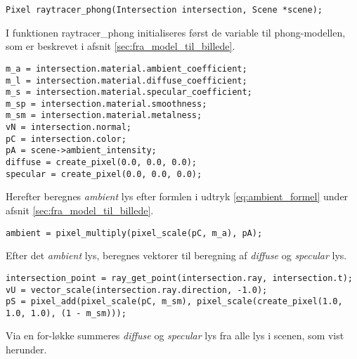 \begin{lstlisting}[style=Cstyle, caption=prototypen til funktionen der beregner pixelfarven på baggrund af data fra skæring med scenen.]
Pixel raytracer_phong(Intersection intersection, Scene *scene);
\end{lstlisting}

I funktionen raytracer\_phong initialiseres først de variable til phong-modellen, som er beskrevet i afsnit
 \ref{sec:fra_model_til_billede}.

\begin{lstlisting}[style=Cstyle, caption=Initialisering af variabler i raytracer\_phong.] 
m_a = intersection.material.ambient_coefficient;
m_l = intersection.material.diffuse_coefficient;
m_s = intersection.material.specular_coefficient;
m_sp = intersection.material.smoothness;
m_sm = intersection.material.metalness;
vN = intersection.normal;
pC = intersection.color;
pA = scene->ambient_intensity;
diffuse = create_pixel(0.0, 0.0, 0.0);
specular = create_pixel(0.0, 0.0, 0.0);
\end{lstlisting}

Herefter beregnes \textit{ambient} lys efter formlen i udtryk \ref{eq:ambient_formel} under afsnit \ref{sec:fra_model_til_billede}.

\begin{lstlisting}[style=Cstyle, caption=Beregning af ambient lys i raytracer\_phong.] 
ambient = pixel_multiply(pixel_scale(pC, m_a), pA);
\end{lstlisting}

Efter det \textit{ambient} lys, beregnes vektorer til beregning af \textit{diffuse} og \textit{specular} lys.

\begin{lstlisting}[style=Cstyle, caption={Beregning af skæring, vektor $\protect\vv{U}$ og pixel S i raytracer\_phong.}] 
intersection_point = ray_get_point(intersection.ray, intersection.t);
vU = vector_scale(intersection.ray.direction, -1.0);
pS = pixel_add(pixel_scale(pC, m_sm), pixel_scale(create_pixel(1.0, 1.0, 1.0), (1 - m_sm)));
\end{lstlisting}

Via en for-løkke summeres \textit{diffuse} og \textit{specular} lys fra alle lys i scenen, som vist herunder.


